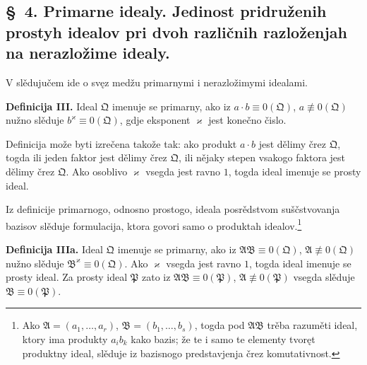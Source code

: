 \documentclass[11pt]{article}
\newcommand{\ideal}[1]{\mathfrak{#1}}
\begin{document}

\setcounter{footnote}{14}
\subsection*{\S~4. Primarne idealy. Jedinost pridruženih prostyh idealov pri dvoh različnih razloženjah na nerazložime idealy.}

V slědujučem ide o svęz medžu primarnymi i nerazložimymi idealami.

\textbf{Definicija III.} Ideal \(\ideal Q\) imenuje se primarny, ako iz \(a\cdot b\equiv0(\ideal Q)\), \(a\not\equiv0(\ideal Q)\) nužno slěduje \(b^\varkappa\equiv0(\ideal Q)\), gdje eksponent \(\varkappa\) jest konečno čislo.

Definicija može byti izrečena takože tak: ako produkt \(a\cdot b\) jest dělimy črez \(\ideal Q\), togda ili jeden faktor jest dělimy črez \(\ideal Q\), ili nějaky stepen vsakogo faktora jest dělimy črez \(\ideal Q\). Ako osoblivo \(\varkappa\) vsegda jest ravno \(1\), togda ideal imenuje se prosty ideal.

Iz definicije primarnogo, odnosno prostogo, ideala posrědstvom suščstvovanja bazisov slěduje formulacija, ktora govori samo o produktah idealov.\footnote{Ako \(\ideal A=(a_1,\ldots,a_r)\), \(\ideal B=(b_1,\ldots,b_s)\), togda pod \(\ideal A\ideal B\) trěba razuměti ideal, ktory ima produkty \(a_i b_k\) kako bazis; že te i samo te elementy tvoręt produktny ideal, slěduje iz bazisnogo predstavjenja črez komutativnost.}

\textbf{Definicija IIIa.} Ideal \(\ideal Q\) imenuje se primarny, ako iz \(\ideal A\ideal B\equiv0(\ideal Q)\), \(\ideal A\not\equiv0(\ideal Q)\) nužno slěduje \(\ideal B^\varkappa\equiv0(\ideal Q)\). Ako \(\varkappa\) vsegda jest ravno \(1\), togda ideal imenuje se prosty ideal. Za prosty ideal \(\ideal P\) zato iz \(\ideal A\ideal B\equiv0(\ideal P)\), \(\ideal A\not\equiv0(\ideal P)\) vsegda slěduje \(\ideal B\equiv0(\ideal P)\).
\end{document}
